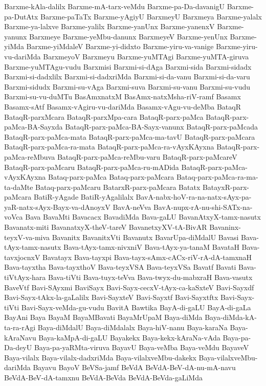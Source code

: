{Barxme-kAla-dalilx
Barxme-mA-tarx-veMdu
Barxme-pa-Da-davanigU
Barxme-pa-DutAtx
Barxme-paTaTx
Barxme-yAgiyU
BarxmeyU
Barxmeya
Barxme-yalalx
Barxme-ya-lalxve
Barxme-yalilx
Barxme-yanUnx
Barxme-yanenxV
Barxme-yanunx
Barxmeye
Barxme-yeMbu-danunx
BarxmeyeV
Barxme-yenUnx
Barxme-yiMda
Barxme-yiMdaleV
Barxme-yi-didxto
Barxme-yiru-va-vanige
Barxme-yiru-vu-dariMda
BarxmeyoV
Barxmeyu
Barxme-yuMTAgi
Barxme-yuMTA-giruva
Barxme-yuMTAgu-vudu
Barxmisi
Barxmi-si-dAga
Barxmi-sida
Barxmi-sidadx
Barxmi-si-dadxlilx
Barxmi-si-dadxriMda
Barxmi-si-da-vanu
Barxmi-si-da-varu
Barxmi-sidudx
Barxmi-su-vAga
Barxmi-suva
Barxmi-su-vanu
Barxmi-su-vudu
Barxmi-su-vu-duMTu
BasAmxnatxM
BasAmx-natxMsha-riV-ramf
Basamx
Basamx-sAtf
Basamx-vAgiru-vu-dariMda
Basamx-vAgu-vu-deMba
BataqR
BataqR-parxMcara
BataqR-parxMpa-cara
BataqR-parx-paMca
BataqR-parx-paMca-BA-Sayxda
BataqR-parx-paMca-BA-Sayx-vanunx
BataqR-parx-paMcada
BataqR-parx-paMca-mata
BataqR-parx-paMca-ma-tavU
BataqR-parx-paMcara
BataqR-parx-paMca-ra-mata
BataqR-parx-paMca-ra-vAyxKAyxna
BataqR-parx-paMca-reMbuva
BataqR-parx-paMca-reMbu-varu
BataqR-parx-paMcareV
BataqR-parx-paMcaru
BataqR-parx-paMca-ru-mADida
BataqR-parx-paMca-vAyxKAyxna
Bataq-parx-paMca
Bataq-parx-paMcara
Bataq-parx-paMca-ra-ma-ta-daMte
Bataq-parx-paMcaru
BatarxR-parx-paMcara
Batatx
BatayxR-parx-paMcara
BatiR-yAgade
BatiR-yAgalilalx
BavA-nabx-hoV-ra-na-natx-sAyx-pa-yaR-natx-sAyx-Bayx-va-dAnoyxV
BavA-neVva
BavA-nupx-rA-nu-shi-SATx-na-voVca
Bava
BavaMti
Bavacacx
BavadiMda
Bava-gaLU
BavanAtxyX-tamx-nasutx
Bavanatx-miti
BavanatxyX-theV-tareV
BavanetxyXV-tA-BivAR
Bavaninx-teyxV-va-miva
Bavanitx
BavanitxVti
Bavanutx
BavarUpa-diMdalU
Bavasi
Bava-tAyx-tamx-nasutx
Bava-tAyx-tamx-nivxniV
Bava-tAyx-ya-tanaM
BavataH
Bava-tavxjocnxV
Bavatayx
Bava-tayxpi
Bava-tayx-sAmx-cACx-riV-rA-dA-tamxnaH
Bava-tayxtha
Bava-tayxthoV
Bava-teyxVSA
Bava-teyxVSa
Bavatf
Bavati
Bava-tiVtAyx-hara
Bava-tiVti
Bava-tuyx-teVva
Bava-twyx-du-mabxraH
Bava-vasutx
BaveVtf
Bavi-SAyxmi
BaviSayx
Bavi-Sayx-cecxV-tAyx-ca-kaSxteV
Bavi-Sayxdf
Bavi-Sayx-tAkx-la-gaLalilx
Bavi-SayxteV
Bavi-Sayxtf
Bavi-Sayxtftx
Bavi-Sayx-tiVti
Bavi-Sayx-veMda-gu-vudu
BavitA
Bawtika
BayA-di-gaLU
BayA-di-gaLa
BayAni
Baya
BayaM
BayaMBavati
BayaMrUpaM
Baya-diMda
Baya-diMda-kA-ta-ra-rAgi
Baya-diMdalU
Baya-diMdalalx
Baya-hiV-nanu
Baya-karaNa
Baya-kAraNavu
Baya-kaMpA-di-gaLU
Bayakekx
Baya-kekx-kAraNa-vAda
Baya-pa-Da-deyU
Baya-pa-yaRMta-viruva
BayavU
Baya-veMba
Baya-veMdu
BayaveV
Baya-vilalx
Baya-vilalx-dadxriMda
Baya-vilalxveMbu-dakekx
Baya-vilalxveMbu-dariMda
Bayavu
BayoV
BeVSa-jamf
BeVdA
BeVdA-BeV-dA-nu-mA-navu
BeVdA-BeV-dA-tamxnu
BeVdA-BeVda
BeVdA-BeVda-gaLiMda
}
